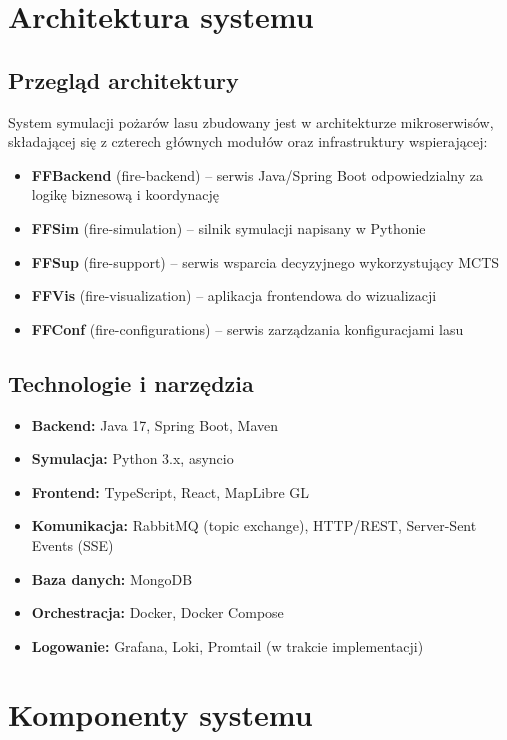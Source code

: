\section{Architektura systemu}

\subsection{Przegląd architektury}

System symulacji pożarów lasu zbudowany jest w architekturze mikroserwisów, składającej się z czterech głównych modułów oraz infrastruktury wspierającej:

\begin{itemize}
    \item \textbf{FFBackend} (fire-backend) -- serwis Java/Spring Boot odpowiedzialny za logikę biznesową i koordynację
    \item \textbf{FFSim} (fire-simulation) -- silnik symulacji napisany w Pythonie
    \item \textbf{FFSup} (fire-support) -- serwis wsparcia decyzyjnego wykorzystujący MCTS
    \item \textbf{FFVis} (fire-visualization) -- aplikacja frontendowa do wizualizacji
    \item \textbf{FFConf} (fire-configurations) -- serwis zarządzania konfiguracjami lasu
\end{itemize}


\subsection{Technologie i narzędzia}

\begin{itemize}
    \item \textbf{Backend:} Java 17, Spring Boot, Maven
    \item \textbf{Symulacja:} Python 3.x, asyncio
    \item \textbf{Frontend:} TypeScript, React, MapLibre GL
    \item \textbf{Komunikacja:} RabbitMQ (topic exchange), HTTP/REST, Server-Sent Events (SSE)
    \item \textbf{Baza danych:} MongoDB
    \item \textbf{Orchestracja:} Docker, Docker Compose
    \item \textbf{Logowanie:} Grafana, Loki, Promtail (w trakcie implementacji)
\end{itemize}

\section{Komponenty systemu}

